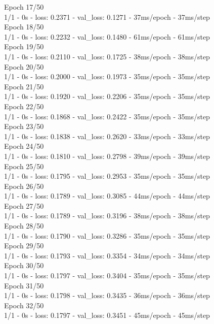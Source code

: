 Epoch 17/50 \\
1/1 - 0s - loss: 0.2371 - val\_loss: 0.1271 - 37ms/epoch - 37ms/step \\
Epoch 18/50 \\
1/1 - 0s - loss: 0.2232 - val\_loss: 0.1480 - 61ms/epoch - 61ms/step \\
Epoch 19/50 \\
1/1 - 0s - loss: 0.2110 - val\_loss: 0.1725 - 38ms/epoch - 38ms/step \\
Epoch 20/50 \\
1/1 - 0s - loss: 0.2000 - val\_loss: 0.1973 - 35ms/epoch - 35ms/step \\
Epoch 21/50 \\
1/1 - 0s - loss: 0.1920 - val\_loss: 0.2206 - 35ms/epoch - 35ms/step \\
Epoch 22/50 \\
1/1 - 0s - loss: 0.1868 - val\_loss: 0.2422 - 35ms/epoch - 35ms/step \\
Epoch 23/50 \\
1/1 - 0s - loss: 0.1838 - val\_loss: 0.2620 - 33ms/epoch - 33ms/step \\
Epoch 24/50 \\
1/1 - 0s - loss: 0.1810 - val\_loss: 0.2798 - 39ms/epoch - 39ms/step \\
Epoch 25/50 \\
1/1 - 0s - loss: 0.1795 - val\_loss: 0.2953 - 35ms/epoch - 35ms/step \\
Epoch 26/50 \\
1/1 - 0s - loss: 0.1789 - val\_loss: 0.3085 - 44ms/epoch - 44ms/step \\
Epoch 27/50 \\
1/1 - 0s - loss: 0.1789 - val\_loss: 0.3196 - 38ms/epoch - 38ms/step \\
Epoch 28/50 \\
1/1 - 0s - loss: 0.1790 - val\_loss: 0.3286 - 35ms/epoch - 35ms/step \\
Epoch 29/50 \\
1/1 - 0s - loss: 0.1793 - val\_loss: 0.3354 - 34ms/epoch - 34ms/step \\
Epoch 30/50 \\
1/1 - 0s - loss: 0.1797 - val\_loss: 0.3404 - 35ms/epoch - 35ms/step \\
Epoch 31/50 \\
1/1 - 0s - loss: 0.1798 - val\_loss: 0.3435 - 36ms/epoch - 36ms/step \\
Epoch 32/50 \\
1/1 - 0s - loss: 0.1797 - val\_loss: 0.3451 - 45ms/epoch - 45ms/step \\
